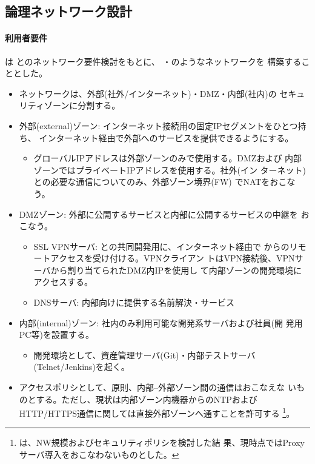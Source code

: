 
  \subsection{論理ネットワーク設計}
  \label{sec:logical-nw-design}

  \paragraph{利用者要件}
\tj は \yo とのネットワーク要件検討をもとに、
・のようなネットワークを
構築することとした。

\begin{itemize}
 \item \yo ネットワークは、外部(社外/インターネット)・DMZ・内部(社内)の
       セキュリティゾーンに分割する。
 \item 外部(external)ゾーン: インターネット接続用の固定IPセグメントをひとつ持ち、
       インターネット経由で外部へのサービスを提供できるようにする。
       \begin{itemize}
        \item グローバルIPアドレスは外部ゾーンのみで使用する。DMZおよび
              内部ゾーンではプライベートIPアドレスを使用する。社外(イン
              ターネット)との必要な通信についてのみ、外部ゾーン境界(FW)
              でNATをおこなう。
       \end{itemize}
 \item DMZゾーン: 外部に公開するサービスと内部に公開するサービスの中継を
       おこなう。
       \begin{itemize}
        \item SSL VPNサーバ: \tj との共同開発用に、インターネット経由で
              \tj からのリモートアクセスを受け付ける。\tj VPNクライアン
              トはVPN接続後、VPNサーバから割り当てられたDMZ内IPを使用し
              て内部ゾーンの開発環境にアクセスする。
        \item DNSサーバ: \yo 内部向けに提供する名前解決・サービス
       \end{itemize}
 \item 内部(internal)ゾーン: 社内のみ利用可能な開発系サーバおよび社員(開
       発用PC等)を設置する。
       \begin{itemize}
        \item 開発環境として、資産管理サーバ(Git)・内部テストサーバ
              (Telnet/Jenkins)を起く。
       \end{itemize}
 \item アクセスポリシとして、原則、内部--外部ゾーン間の通信はおこなえな
       いものとする。ただし、現状は内部ゾーン内機器からのNTPおよび
       HTTP/HTTPS通信に関しては直接外部ゾーンへ通すことを許可する
       \footnote{\tj は、\yo NW規模およびセキュリティポリシを検討した結
       果、現時点ではProxyサーバ導入をおこなわないものとした。}。
\end{itemize}

